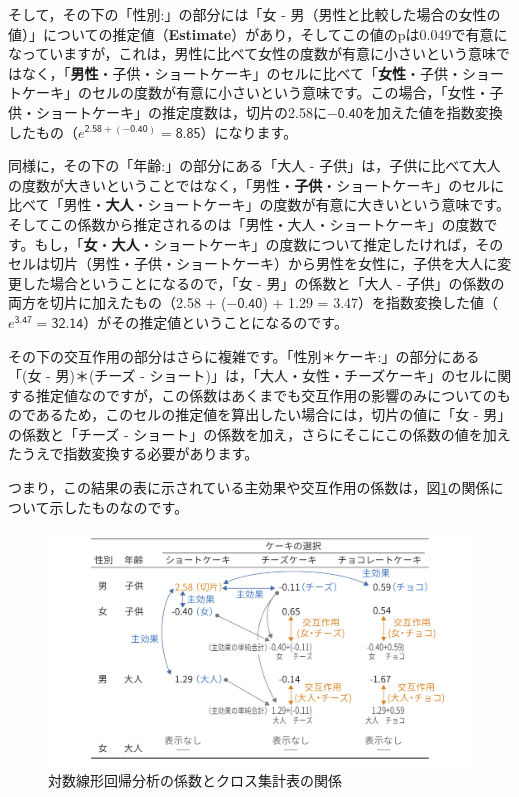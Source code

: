 \documentclass[
  12pt,
  a5jpaper,
  lualatex, ja=standard]{bxjsbook}
\begin{document}
そして，その下の「性別:」の部分には「女 - 男（男性と比較した場合の女性の値）」についての推定値（\textbf{Estimate}）があり，そしてこの値のpは0.049で有意になっていますが，これは，男性に比べて女性の度数が有意に小さいという意味ではなく，「\textbf{男性}・子供・ショートケーキ」のセルに比べて「\textbf{女性}・子供・ショートケーキ」のセルの度数が有意に小さいという意味です。この場合，「女性・子供・ショートケーキ」の推定度数は，切片の2.58に\(-\textsf{0.40}\)を加えた値を指数変換したもの（\(e^{\textsf{2.58}+(-\textsf{0.40})}=\textsf{8.85}\)）になります。

同様に，その下の「年齢:」の部分にある「大人 - 子供」は，子供に比べて大人の度数が大きいということではなく，「男性・\textbf{子供}・ショートケーキ」のセルに比べて「男性・\textbf{大人}・ショートケーキ」の度数が有意に大きいという意味です。そしてこの係数から推定されるのは「男性・大人・ショートケーキ」の度数です。もし，「\textbf{女}・\textbf{大人}・ショートケーキ」の度数について推定したければ，そのセルは切片（男性・子供・ショートケーキ）から男性を女性に，子供を大人に変更した場合ということになるので，「女 - 男」の係数と「大人 - 子供」の係数の両方を切片に加えたもの（2.58 + (\(-\textsf{0.40}\)) + 1.29 = 3.47）を指数変換した値（\(e^{\textsf{3.47}}=\textsf{32.14}\)）がその推定値ということになるのです。

その下の交互作用の部分はさらに複雑です。「性別＊ケーキ:」の部分にある「(女 - 男)＊(チーズ - ショート)」は，「大人・女性・チーズケーキ」のセルに関する推定値なのですが，この係数はあくまでも交互作用の影響のみについてのものであるため，このセルの推定値を算出したい場合には，切片の値に「女 - 男」の係数と「チーズ - ショート」の係数を加え，さらにそこにこの係数の値を加えたうえで指数変換する必要があります。

つまり，この結果の表に示されている主効果や交互作用の係数は，図\ref{fig:frequencies-loglin-results-interpretation}の関係について示したものなのです。

\begin{figure}[!ht]

{\centering \includegraphics[width=1\linewidth]{images/frequencies/loglin-results-interpretation} 

}

\caption{対数線形回帰分析の係数とクロス集計表の関係}\label{fig:frequencies-loglin-results-interpretation}
\end{figure}
\end{document}
